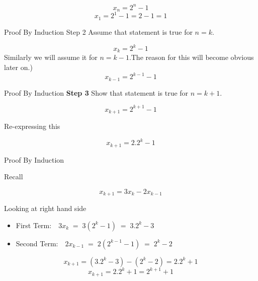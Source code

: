 \[ x_n = 2^n - 1 \]
\[ x_1 = 2^1 - 1 = 2 - 1 = 1\]


{Proof By Induction}
Step 2 Assume that statement is true for $n=k$.

\[ x_k = 2^k - 1 \]
Similarly we will assume it for $n=k-1$.The reason for this will become obvious later on.)
\[ x_{k-1} = 2^{k-1} - 1 \]


{Proof By Induction}
\textbf{Step 3} Show that statement is true for $n=k+1$.

\[ x_{k+1} = 2^{k+1} - 1 \]

Re-expressing this

\[ x_{k+1} = 2.2^{k} - 1 \]


{Proof By Induction}

Recall
 
\[ x_{k+1} = 3x_{k} - 2x_{k-1} \]


Looking at right hand side 
\begin{itemize}
\item First Term: $\mbox{       }  3x_{k}\; = \;3(2^{k} - 1) \;=\; 3.2^{k} - 3$
\item Second Term: $ \mbox{       }2x_{k-1} \;= \;2(2^{k-1} - 1) \;= \;2^{k} - 2$
\end{itemize}

\[ x_{k+1} = (3.2^{k} - 3) - (2^{k} - 2) = 2.2^{k} + 1 \]
\[ x_{k+1} = 2.2^{k} + 1 = 2^{k+1} + 1 \]

 
 




